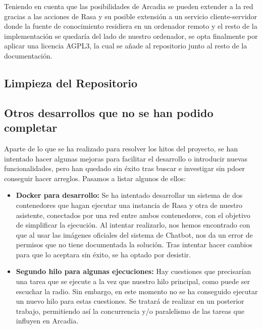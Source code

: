 Teniendo en cuenta que las posibilidades de Arcadia se pueden extender a la red gracias a las acciones de Rasa y su posible extensión a un servicio cliente-servidor donde la fuente de conocimiento residiera en un ordenador remoto y el resto de la implementación se quedaría del lado de nuestro ordenador, se opta finalmente por aplicar una licencia AGPL3, la cual se añade al repositorio junto al resto de la documentación.

\subsection{Limpieza del Repositorio}

\subsection{Otros desarrollos que no se han podido completar}
Aparte de lo que se ha realizado para resolver los hitos del proyecto, se han intentado hacer algunas mejoras para facilitar el desarrollo o introducir nuevas funcionalidades, pero han quedado sin éxito tras buscar e investigar sin pdoer conseguir hacer arreglos. Pasamos a listar algunos de ellos:
\begin{itemize}
	\item \textbf{Docker para desarrollo:} Se ha intentado desarrollar un sistema de dos contenedores que hagan ejecutar una instancia de Rasa y otra de nuestro asistente, conectados por una red entre ambos contenedores, con el objetivo de simplificar la ejecución. Al intentar realizarlo, nos hemos encontrado con que al usar las imágenes oficiales del sistema de Chatbot, nos da un error de permisos que no tiene documentada la solución. Tras intentar hacer cambios para que lo aceptara sin éxito, se ha optado por desistir.
	\item \textbf{Segundo hilo para algunas ejecuciones:} Hay cuestiones que precisarían una tarea que se ejecute a la vez que nuestro hilo principal, como puede ser escuchar la radio. Sin embargo, en este momento no se ha conseguido ejecutar un nuevo hilo para estas cuestiones. Se tratará de realizar en un posterior trabajo, permitiendo así la concurrencia y/o paralelismo de las tareas que influyen en Arcadia.
\end{itemize}

